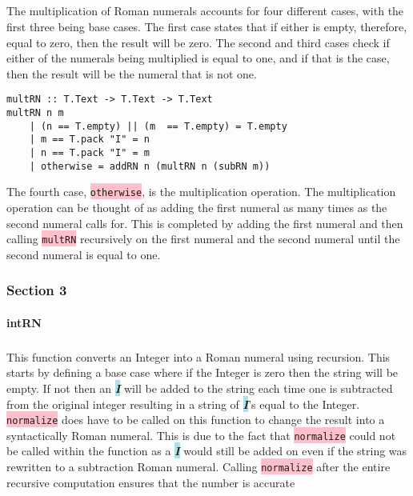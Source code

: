 \documentclass{article}
\begin{document}
\subparagraph{}

The multiplication of Roman numerals accounts for four different cases, with the first three being base cases. The first case states that if either is empty, therefore, equal to zero, then the result will be zero. The second and third cases check if either of the numerals being multiplied is equal to one, and if that is the case, then the result will be the numeral that is not one. 

\begin{lstlisting}
multRN :: T.Text -> T.Text -> T.Text
multRN n m
    | (n == T.empty) || (m  == T.empty) = T.empty
    | m == T.pack "I" = n
    | n == T.pack "I" = m
    | otherwise = addRN n (multRN n (subRN m))
\end{lstlisting}

The fourth case, \colorbox{pink}{\lstinline{otherwise}}, is the multiplication operation. The multiplication operation can be thought of as adding the first numeral as many times as the second numeral calls for. This is completed by adding the first numeral and then calling \colorbox{pink}{\lstinline{multRN}} recursively on the first numeral and the second numeral until the second numeral is equal to one.

\subsubsection{Section 3}

\paragraph{intRN}

\subparagraph{}

This function converts an Integer into a Roman numeral using recursion. This starts by defining a base case where if the Integer is zero then the string will be empty. If not then an \colorbox{powderblue}{\textbf{\textit{I}}} will be added to the string each time one is subtracted from the original integer resulting in a string of \colorbox{powderblue}{\textbf{\textit{I}}}’s equal to the Integer. \colorbox{pink}{\lstinline{normalize}} does have to be called on this function to change the result into a syntactically Roman numeral. This is due to the fact that \colorbox{pink}{\lstinline{normalize}} could not be called within the function as a  \colorbox{powderblue}{\textbf{\textit{I}}}  would still be added on even if the string was rewritten to a subtraction Roman numeral. Calling \colorbox{pink}{\lstinline{normalize}} after the entire recursive computation ensures that the number is accurate
\end{document}
